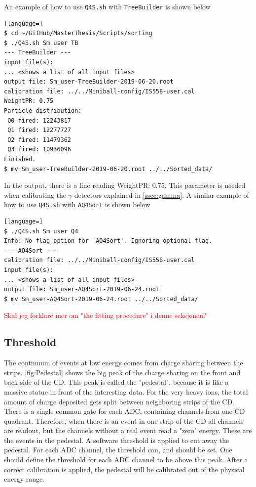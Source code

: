 \documentclass[twoside,english]{uiofysmaster/uiofysmaster}
\newcommand{\ga}{$\gamma$}
\let\orgautoref\autoref
\renewcommand{\autoref}
        {%
		 \def\subsectionautorefname{Section}%
		 \def\subsubsectionautorefname{Section}%
          \orgautoref}
\begin{document}
An example of how to use \texttt{Q4S.sh} with \texttt{TreeBuilder} is shown below
\begin{lstlisting}[language=]
$ cd ~/GitHub/MasterThesis/Scripts/sorting 
$ ./Q4S.sh Sm user TB
--- TreeBuilder ---
input file(s):
... <shows a list of all input files>
output file: Sm_user-TreeBuilder-2019-06-20.root
calibration file: ../../Miniball-config/IS558-user.cal
WeightPR: 0.75
Particle distribution:
 Q0 fired: 12243817
 Q1 fired: 12277727
 Q2 fired: 11479362
 Q3 fired: 10936096
Finished.
$ mv Sm_user-TreeBuilder-2019-06-20.root ../../Sorted_data/
\end{lstlisting}
In the output, there is a line reading WeightPR: 0.75. 
This parameter is needed when calibrating the \ga-detectors explained in \autoref{ssec:gamma}. 
A similar example of how to use \texttt{Q4S.sh} with \texttt{AQ4Sort} is shown below
\begin{lstlisting}[language=]
$ ./Q4S.sh Sm user Q4
Info: No flag option for 'AQ4Sort'. Ignoring optional flag.
--- AQ4Sort ---
calibration file: ../../Miniball-config/IS558-user.cal
input file(s):
... <shows a list of all input files>
output file: Sm_user-AQ4Sort-2019-06-24.root
$ mv Sm_user-AQ4Sort-2019-06-24.root ../../Sorted_data/
\end{lstlisting}


\bigskip

\textcolor{red}{Skal jeg forklare mer om "the fitting procedure" i denne seksjonen?}



\subsection{Threshold}\label{ssec:threshold}
The continuum of events at low energy comes from charge sharing between the strips.
\autoref{fig:Pedestal} shows the big peak of the charge sharing on the front and back side of the CD. 
This peak is called the "pedestal", because it is like a massive statue in front of the interesting data. 
For the very heavy ions, the total amount of charge deposited gets split between neighboring strips of the CD. 
There is a single common gate for each ADC, containing channels from one CD quadrant. 
Therefore, when there is an event in one strip of the CD all channels are readout, but the channels without a real event read a "zero" energy.
These are the events in the pedestal.
A software threshold is applied to cut away the pedestal. 
For each ADC channel, the threshold can, and should be set. 
One should define the threshold for each ADC channel to be above this peak.
After a correct calibration is applied, the pedestal will be calibrated out of the physical energy range.
\end{document}
